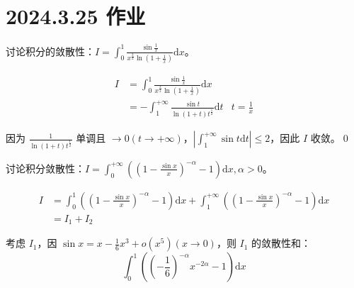 \ifx\allfiles\undefined

\date{}
\author{尹锦润}

\maketitle
\fi

\section{2024.3.25 作业}

\begin{ques}
	讨论积分的敛散性：$\displaystyle I=\int _{0}^{1}\frac{\sin\frac{1}{x}}{x^{\frac{3}{2}}\ln\left( 1+\frac{1}{x}\right)}\mathrm{d} x$。
\end{ques}

\begin{align*}
	I & =\int _{0}^{1}\frac{\sin\frac{1}{x}}{x^{\frac{3}{2}}\ln\left( 1+\frac{1}{x}\right)}\mathrm{d} x & \\
	& =-\int _{1}^{+\infty }\frac{\sin t}{\ln( 1+t) t^{\frac{1}{2}}}\mathrm{d} t & t=\frac{1}{x}
\end{align*}


因为 $\displaystyle \frac{1}{\ln( 1+t) t^{\frac{1}{2}}}$ 单调且 $\displaystyle \rightarrow 0\left( t\rightarrow +\infty \right)$，$\displaystyle \left| \int _{1}^{+\infty }\sin t\mathrm{d} t\right| \leqslant 2$，因此 $\displaystyle I$ 收敛。\qed 





\begin{ques}
	讨论积分敛散性：$\displaystyle I=\int _{0}^{+\infty }\left(\left( 1-\frac{\sin x}{x}\right)^{-\alpha } -1\right)\mathrm{d} x,\alpha  >0$。
\end{ques}


\begin{align*}
	I & =\int _{0}^{1}\left(\left( 1-\frac{\sin x}{x}\right)^{-\alpha } -1\right)\mathrm{d} x+\int _{1}^{+\infty }\left(\left( 1-\frac{\sin x}{x}\right)^{-\alpha } -1\right)\mathrm{d} x\\
	& =I_{1} +I_{2}
\end{align*}


考虑 $\displaystyle I_{1}$，因 $\displaystyle \sin x=x-\frac{1}{6} x^{3} +o\left( x^{5}\right)\left( x\rightarrow 0\right)$，则 $\displaystyle I_{1}$ 的敛散性和：
\begin{equation*}
	\int _{0}^{1}\left(\left( -\frac{1}{6}\right)^{-\alpha } x^{-2\alpha } -1\right)\mathrm{d} x
\end{equation*}


